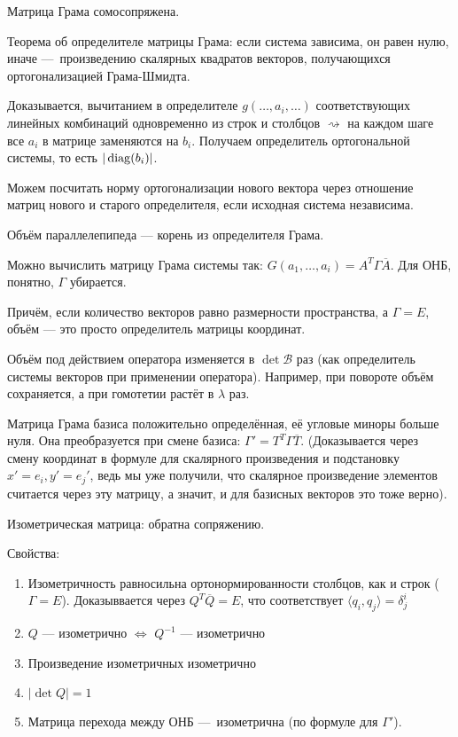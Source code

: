 \documentclass[12pt, a4paper]{article}
\begin{document}
Матрица Грама сомосопряжена.

Теорема об определителе матрицы Грама: если система зависима, он равен нулю, 
иначе — произведению скалярных квадратов векторов, получающихся ортогонализацией Грама-Шмидта.

Доказывается, вычитанием в определителе $g(…, a_i, …)$ соответствующих линейных комбинаций одновременно из строк и столбцов 
$\rightsquigarrow$ на каждом шаге все $a_i$ в матрице заменяются на $b_i$. Получаем определитель ортогональной системы, то есть $| \operatorname{diag} (b_i) |$.

Можем посчитать норму ортогонализации нового вектора через отношение матриц нового и старого определителя, если исходная система независима.

Объём параллелепипеда — корень из определителя Грама.

Можно вычислить матрицу Грама системы так: $G(a_1, …, a_i) = A^T \Gamma \overline{A}$. Для ОНБ, понятно, $\Gamma$ убирается.

Причём, если количество векторов равно размерности пространства, а $\Gamma = E$, объём — это просто определитель матрицы координат.

Объём под действием оператора изменяется в $\det \mathcal{B}$ раз (как определитель системы векторов при применении оператора). 
Например, при повороте объём сохраняется, а при гомотетии растёт в $\lambda$ раз.

Матрица Грама базиса положительно определённая, её угловые миноры больше нуля.
Она преобразуется при смене базиса: $\Gamma' = T^T \Gamma \overline{T}$. 
(Доказывается через смену координат в формуле для скалярного произведения и подстановку $x' = e_i, y' = e_j'$, ведь мы уже получили, 
что скалярное произведение элементов считается через эту матрицу, а значит, и для базисных векторов это тоже верно).



Изометрическая матрица: обратна сопряжению.

Свойства: 

\begin{enumerate}
    \item Изометричность равносильна ортонормированности столбцов, как и строк ($\Gamma = E$). Доказыввается через $Q^T \overline{Q} = E$, что соответствует $\langle q_i, q_j \rangle = \delta^i_j$
    \item $Q$ — изометрично $\Leftrightarrow$ $Q^{-1}$ — изометрично 
    \item Произведение изометричных изометрично
    \item $| \det Q | = 1$
    \item Матрица перехода между ОНБ — изометрична (по формуле для $\Gamma'$).
\end{enumerate} 
\end{document}
